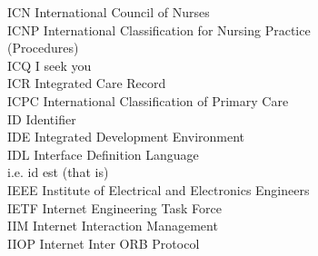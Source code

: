 \begin{tabbing}

    \>ICN \>\>International Council of Nurses\\

    \>ICNP \>\>International Classification for Nursing Practice\\
        \>\>\>(Procedures)\\

    \>ICQ \>\>I seek you\\

    \>ICR \>\>Integrated Care Record\\

    \>ICPC \>\>International Classification of Primary Care\\


    \>ID \>\>Identifier\\

    \>IDE \>\>Integrated Development Environment\\


    \>IDL \>\>Interface Definition Language\\


    \>i.e. \>\>id est (that is)\\

    \>IEEE \>\>Institute of Electrical and Electronics Engineers\\

    \>IETF \>\>Internet Engineering Task Force\\




    \>IIM \>\>Internet Interaction Management\\

    \>IIOP \>\>Internet Inter ORB Protocol\\


\end{tabbing}
